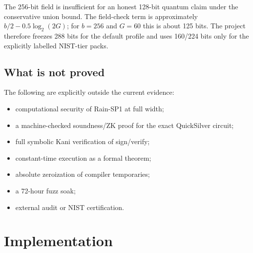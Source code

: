 \documentclass[11pt,a4paper]{article}
\begin{document}
The 256-bit field is insufficient for an honest 128-bit quantum claim under
the conservative union bound. The field-check term is approximately
$b/2-0.5\log_2(2G)$; for $b=256$ and $G=60$ this is about 125 bits. The
project therefore freezes 288 bits for the default profile and uses 160/224
bits only for the explicitly labelled NIST-tier packs.

\begin{table}[ht]
\centering
\small
\caption{Conservative component floors in bits (quantum/classical). The
overall floor is the minimum; it is not a certification.}
\label{tab:floors}
\end{table}

\subsection{What is not proved}
\label{sec:limits}

The following are explicitly outside the current evidence:

\begin{itemize}
  \item computational security of Rain-SP1 at full width;
  \item a machine-checked soundness/ZK proof for the exact QuickSilver circuit;
  \item full symbolic Kani verification of sign/verify;
  \item constant-time execution as a formal theorem;
  \item absolute zeroization of compiler temporaries;
  \item a 72-hour fuzz soak;
  \item external audit or NIST certification.
\end{itemize}

\section{Implementation}
\label{sec:impl}
\end{document}

